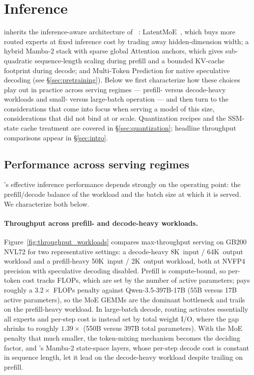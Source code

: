 \section{Inference}
\label{sec:inference}

\ourmodel inherits the inference-aware architecture of
\supermodel~\citep{nvidia2026nemotron3superopen}: LatentMoE~\citep{latentmoe_tr},
which buys more routed experts at fixed inference cost by trading away
hidden-dimension width; a hybrid Mamba-2 stack with sparse global Attention
anchors, which gives sub-quadratic sequence-length scaling during prefill
and a bounded KV-cache footprint during decode; and Multi-Token Prediction
for native speculative decoding (see \S\ref{sec:pretraining}). Below we first
characterize how these choices play out in practice across serving regimes ---
prefill- versus decode-heavy workloads and small- versus large-batch operation
--- and then turn to the considerations that come into focus when serving a
model of this size, considerations that did not bind at \supermodel{} or
\nanomodel{} scale.
Quantization recipes and the SSM-state cache treatment are covered in
\S\ref{sec:quantization}; headline throughput comparisons appear in
\S\ref{sec:intro}.

\subsection{Performance across serving regimes}
\label{sec:inference:regimes}
\ourmodel{}'s effective inference performance depends strongly on the
operating point: the prefill/decode balance of the workload and the batch
size at which it is served. We characterize both below.

\paragraph{Throughput across prefill- and decode-heavy workloads.}
\label{sec:inference:workloads}
Figure~\ref{fig:throughput_workloads} compares max-throughput serving on
GB200 NVL72 for two representative settings:
a decode-heavy 8K~input / 64K~output workload and a prefill-heavy
50K~input / 2K~output workload, both at NVFP4 precision with speculative
decoding disabled.
Prefill is compute-bound, so per-token cost tracks FLOPs, which are set by
the number of active parameters; \ourmodel{} pays roughly a $3.2\times$ FLOPs
penalty against Qwen-3.5-397B-17B (55B versus 17B active parameters), so the
MoE GEMMs are the dominant bottleneck and \ourmodel{} trails on the
prefill-heavy workload.
In large-batch decode, routing activates essentially all experts and per-step
cost is instead set by total weight I/O, where the gap shrinks to roughly
$1.39\times$ (550B versus 397B total parameters). With the MoE penalty that
much smaller, the token-mixing mechanism becomes the deciding factor, and
\ourmodel{}'s Mamba-2 state-space layers, whose per-step decode cost is
constant in sequence length, let it lead on the decode-heavy workload despite
trailing on prefill.

